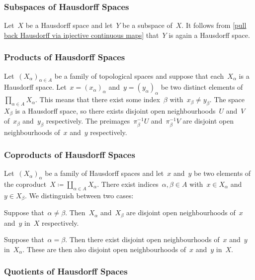 \subsubsection{Subspaces of Hausdorff Spaces}

Let~$X$ be a Hausdorff space and let~$Y$ be a subspace of~$X$.
It follows from \cref{pull back Hausdorff via injective continuous maps} that~$Y$ is again a Hausdorff space.



\subsubsection{Products of Hausdorff Spaces}

Let~$(X_α)_{α ∈ A}$ be a family of topological spaces and suppose that each~$X_α$ is a Hausdorff space.
Let~$x = (x_α)_α$ and~$y = (y_α)_α$ be two distinct elements of~$∏_{α ∈ A} X_α$.
This means that there exist some index~$β$ with~$x_β ≠ y_β$.
The space~$X_β$ is a Hausdorff space, so there exists disjoint open neighbourhoods~$U$ and~$V$ of~$x_β$ and~$y_β$ respectively.
The preimages~$π_β^{-1} U$ and~$π_β^{-1} V$ are disjoint open neighbourhoods of~$x$ and~$y$ respectively.



\subsubsection{Coproducts of Hausdorff Spaces}

Let~$(X_α)_α$ be a family of Hausdorff spaces and let~$x$ and~$y$ be two elements of the coproduct~$X ≔ ∐_{α ∈ A} X_α$.
There exist indices~$α, β ∈ A$ with~$x ∈ X_α$ and~$y ∈ X_β$.
We distinguish between two cases:

\begin{casedistinction}

	\item
		Suppose that~$α ≠ β$.
		Then~$X_α$ and~$X_β$ are disjoint open neighbourhoods of~$x$ and~$y$ in~$X$ respectively.

	\item
		Suppose that~$α = β$.
		Then there exist disjoint open neighbourhoods of~$x$ and~$y$ in~$X_α$.
		These are then also disjoint open neighbourhoods of~$x$ and~$y$ in~$X$.

\end{casedistinction}



\subsubsection{Quotients of Hausdorff Spaces}

